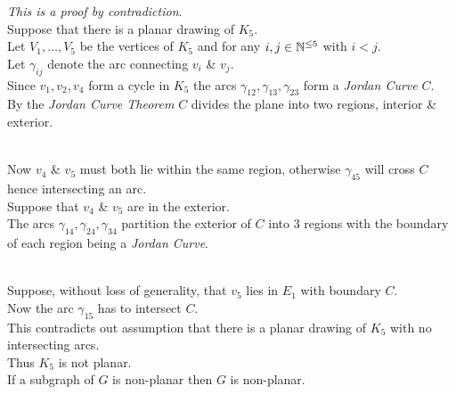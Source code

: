 \documentclass[11pt,a4paper]{article}
\begin{document}
\textit{This is a proof by contradiction}.\\
Suppose that there is a planar drawing of $K_5$.\\
Let $V_1,\dots,V_5$ be the vertices of $K_5$ and for any $i,j\in\mathbb{N}^{\leq 5}$ with $i<j$.\\
Let $\gamma_{ij}$ denote the arc connecting $v_i$ \& $v_j$.\\
Since $v_1,v_2,v_4$ form a cycle in $K_5$ the arcs $\gamma_{12},\gamma_{13},\gamma_{23}$ form a \textit{Jordan Curve} $C$.\\
By the \textit{Jordan Curve Theorem} $C$ divides the plane into two regions, interior \& exterior.\\
\\
Now $v_4$ \& $v_5$ must both lie within the same region, otherwise $\gamma_{45}$ will cross $C$ hence intersecting an arc.\\
Suppose that $v_4$ \& $v_5$ are in the exterior.\\
The arcs $\gamma_{14},\gamma_{24},\gamma_{34}$ partition the exterior of $C$ into 3 regions with the boundary of each region being a \textit{Jordan Curve}.\\
\\
Suppose, without loss of generality, that $v_5$ lies in $E_1$ with boundary $C$.\\
Now the arc $\gamma_{15}$ has to intersect $C$.\\
This contradicts out assumption that there is a planar drawing of $K_5$ with no intersecting arcs.\\
Thus $K_5$ is not planar.\\

If a subgraph of $G$ is non-planar then $G$ is non-planar.\\
\end{document}
